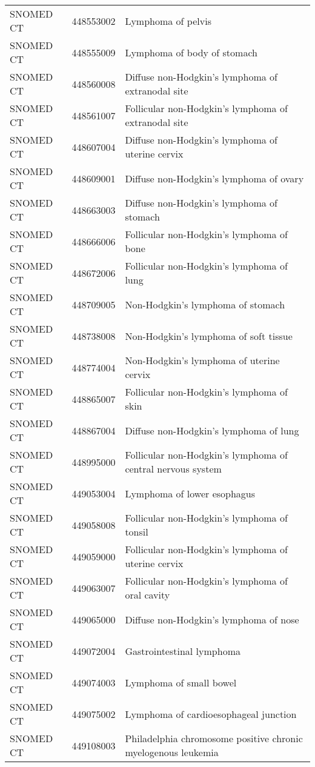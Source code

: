 \begin{table}[ht]
\begin{tabular}{lll}
  SNOMED CT & 448553002 & Lymphoma of pelvis \\ 
  SNOMED CT & 448555009 & Lymphoma of body of stomach \\ 
  SNOMED CT & 448560008 & Diffuse non-Hodgkin's lymphoma of extranodal site \\ 
  SNOMED CT & 448561007 & Follicular non-Hodgkin's lymphoma of extranodal site \\ 
  SNOMED CT & 448607004 & Diffuse non-Hodgkin's lymphoma of uterine cervix \\ 
  SNOMED CT & 448609001 & Diffuse non-Hodgkin's lymphoma of ovary \\ 
  SNOMED CT & 448663003 & Diffuse non-Hodgkin's lymphoma of stomach \\ 
  SNOMED CT & 448666006 & Follicular non-Hodgkin's lymphoma of bone \\ 
  SNOMED CT & 448672006 & Follicular non-Hodgkin's lymphoma of lung \\ 
  SNOMED CT & 448709005 & Non-Hodgkin's lymphoma of stomach \\ 
  SNOMED CT & 448738008 & Non-Hodgkin's lymphoma of soft tissue \\ 
  SNOMED CT & 448774004 & Non-Hodgkin's lymphoma of uterine cervix \\ 
  SNOMED CT & 448865007 & Follicular non-Hodgkin's lymphoma of skin \\ 
  SNOMED CT & 448867004 & Diffuse non-Hodgkin's lymphoma of lung \\ 
  SNOMED CT & 448995000 & Follicular non-Hodgkin's lymphoma of central nervous system \\ 
  SNOMED CT & 449053004 & Lymphoma of lower esophagus \\ 
  SNOMED CT & 449058008 & Follicular non-Hodgkin's lymphoma of tonsil \\ 
  SNOMED CT & 449059000 & Follicular non-Hodgkin's lymphoma of uterine cervix \\ 
  SNOMED CT & 449063007 & Follicular non-Hodgkin's lymphoma of oral cavity \\ 
  SNOMED CT & 449065000 & Diffuse non-Hodgkin's lymphoma of nose \\ 
  SNOMED CT & 449072004 & Gastrointestinal lymphoma \\ 
  SNOMED CT & 449074003 & Lymphoma of small bowel \\ 
  SNOMED CT & 449075002 & Lymphoma of cardioesophageal junction \\ 
  SNOMED CT & 449108003 & Philadelphia chromosome positive chronic myelogenous leukemia \\ 

\end{tabular}
\end{table}
